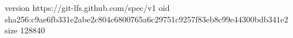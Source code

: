 version https://git-lfs.github.com/spec/v1
oid sha256:c9ae6fb331e2abe2c804c6800765a6c29751c9257f83eb8c99e44300bdb341e2
size 128840

